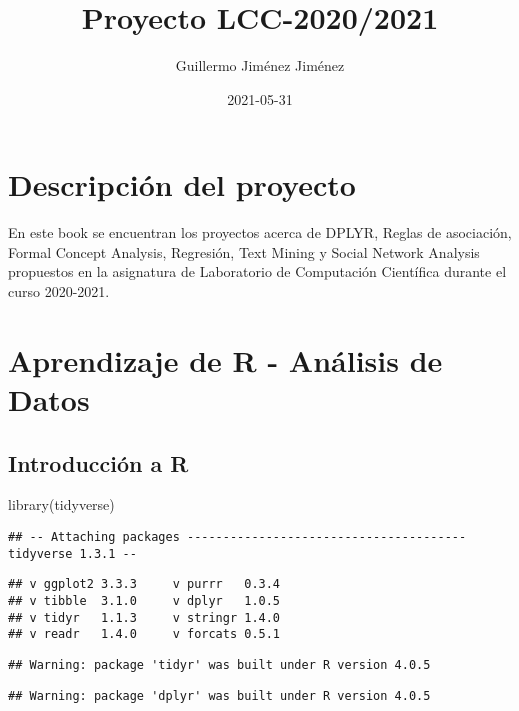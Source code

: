 \documentclass[
]{book}
\title{Proyecto LCC-2020/2021}
\author{Guillermo Jiménez Jiménez}
\date{2021-05-31}
\newenvironment{Shaded}{\begin{snugshade}}{\end{snugshade}}
\newcommand{\FunctionTok}[1]{\textcolor[rgb]{0.00,0.00,0.00}{#1}}
\newcommand{\NormalTok}[1]{#1}
\begin{document}
\maketitle

{
\setcounter{tocdepth}{1}
\tableofcontents
}
\hypertarget{descripciuxf3n-del-proyecto}{%
\chapter{Descripción del proyecto}\label{descripciuxf3n-del-proyecto}}

En este book se encuentran los proyectos acerca de DPLYR, Reglas de asociación, Formal Concept Analysis, Regresión, Text Mining y Social Network Analysis propuestos en la asignatura de Laboratorio de Computación Científica durante el curso 2020-2021.

\hypertarget{aprendizaje-de-r---anuxe1lisis-de-datos}{%
\chapter{Aprendizaje de R - Análisis de Datos}\label{aprendizaje-de-r---anuxe1lisis-de-datos}}

\hypertarget{introducciuxf3n-a-r}{%
\section{Introducción a R}\label{introducciuxf3n-a-r}}

\begin{Shaded}
\begin{Highlighting}[]
\FunctionTok{library}\NormalTok{(tidyverse)}
\end{Highlighting}
\end{Shaded}

\begin{verbatim}
## -- Attaching packages --------------------------------------- tidyverse 1.3.1 --
\end{verbatim}

\begin{verbatim}
## v ggplot2 3.3.3     v purrr   0.3.4
## v tibble  3.1.0     v dplyr   1.0.5
## v tidyr   1.1.3     v stringr 1.4.0
## v readr   1.4.0     v forcats 0.5.1
\end{verbatim}

\begin{verbatim}
## Warning: package 'tidyr' was built under R version 4.0.5
\end{verbatim}

\begin{verbatim}
## Warning: package 'dplyr' was built under R version 4.0.5
\end{verbatim}
\end{document}
